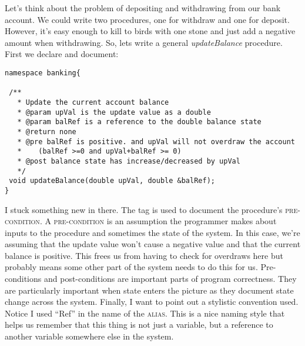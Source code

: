 \documentclass[]{tufte-handout}
\begin{document}
Let's think about the problem of depositing and withdrawing from our bank account. We could write two procedures, one for withdraw and one for deposit. However, it's easy enough to kill to birds with one stone and just add a negative amount when withdrawing. So, lets write a general \textit{updateBalance} procedure. First we declare and document:
\begin{verbatim}
namespace banking{

 /**
   * Update the current account balance
   * @param upVal is the update value as a double
   * @param balRef is a reference to the double balance state
   * @return none
   * @pre balRef is positive. and upVal will not overdraw the account
   *    (balRef >=0 and upVal+balRef >= 0)
   * @post balance state has increase/decreased by upVal
   */
 void updateBalance(double upVal, double &balRef);
}
\end{verbatim}
I stuck something new in there. The \textit{\@pre} tag is used to document the procedure's \textsc{pre-condition}. A \textsc{pre-condition} is an assumption the programmer makes about inputs to the procedure and sometimes the state of the system. In this case, we're assuming that the update value won't cause a negative value and that the current balance is positive. This frees us from having to check for overdraws here but probably means some other part of the system needs to do this for us. Pre-conditions and post-conditions are important parts of program correctness. They are particularly important when state enters the picture as they document state change across the system. Finally, I want to point out a stylistic convention used. Notice I used ``Ref'' in the name of the \textsc{alias}. This is a nice naming style that helps us remember that this thing is not just a variable, but a reference to another variable somewhere else in the system. 
\end{document}
